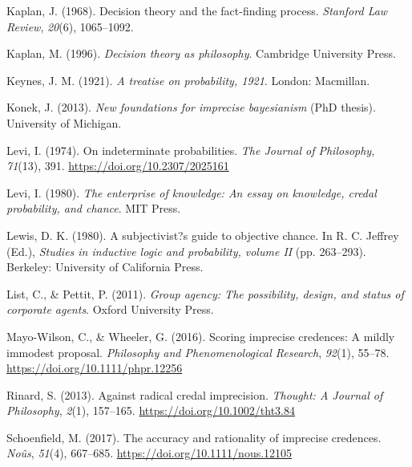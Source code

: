 \documentclass[
  10pt,
  dvipsnames,enabledeprecatedfontcommands]{scrartcl}
\newlength{\cslhangindent}
\newlength{\cslentryspacingunit} %
\newenvironment{CSLReferences}[2] %
 {%
  \setlength{\parindent}{0pt}
  \ifodd #1
  \let\oldpar\par
  \def\par{\hangindent=\cslhangindent\oldpar}
  \fi
  \setlength{\parskip}{#2\cslentryspacingunit}
 }%
 {}
\begin{document}
\begin{CSLReferences}{1}{0}
\leavevmode{}%
Kaplan, J. (1968). Decision theory and the fact-finding process.
\emph{Stanford Law Review}, \emph{20}(6), 1065--1092.

\leavevmode{}%
Kaplan, M. (1996). \emph{Decision theory as philosophy}. Cambridge
University Press.

\leavevmode{}%
Keynes, J. M. (1921). \emph{A treatise on probability, 1921}. London:
Macmillan.

\leavevmode{}%
Konek, J. (2013). \emph{New foundations for imprecise bayesianism} (PhD
thesis). University of Michigan.

\leavevmode{}%
Levi, I. (1974). On indeterminate probabilities. \emph{The Journal of
Philosophy}, \emph{71}(13), 391. \url{https://doi.org/10.2307/2025161}

\leavevmode{}%
Levi, I. (1980). \emph{The enterprise of knowledge: An essay on
knowledge, credal probability, and chance}. MIT Press.

\leavevmode{}%
Lewis, D. K. (1980). A subjectivist?s guide to objective chance. In R.
C. Jeffrey (Ed.), \emph{Studies in inductive logic and probability,
volume II} (pp. 263--293). Berkeley: University of California Press.

\leavevmode{}%
List, C., \& Pettit, P. (2011). \emph{Group agency: The possibility,
design, and status of corporate agents}. Oxford University Press.

\leavevmode{}%
Mayo-Wilson, C., \& Wheeler, G. (2016). Scoring imprecise credences: A
mildly immodest proposal. \emph{Philosophy and Phenomenological
Research}, \emph{92}(1), 55--78.
\url{https://doi.org/10.1111/phpr.12256}

\leavevmode{}%
Rinard, S. (2013). Against radical credal imprecision. \emph{Thought: A
Journal of Philosophy}, \emph{2}(1), 157--165.
\url{https://doi.org/10.1002/tht3.84}

\leavevmode{}%
Schoenfield, M. (2017). The accuracy and rationality of imprecise
credences. \emph{Noûs}, \emph{51}(4), 667--685.
\url{https://doi.org/10.1111/nous.12105}


\end{CSLReferences}
\end{document}
